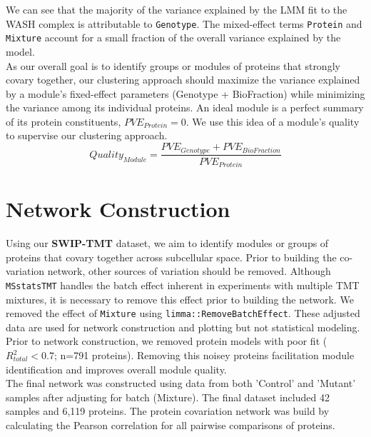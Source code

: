 \documentclass[11pt]{elife}\usepackage[]{graphicx}\usepackage[]{color}
\begin{document}
We can see that the majority of the variance explained by the LMM fit to the
WASH complex is attributable to \texttt{Genotype}. The mixed-effect terms
\texttt{Protein} and \texttt{Mixture} account for a small fraction of the 
overall variance explained by the model.\\

As our overall goal is to identify groups or modules of proteins that strongly
covary together, our clustering approach should maximize the variance explained
by a module's fixed-effect parameters (Genotype + BioFraction) while minimizing 
the variance among its individual proteins. 
An ideal module is a perfect summary of its protein constituents, 
$PVE_{Protein}=0$. We use this idea of a module's quality to supervise our 
clustering approach.\\

\begin{equation}
	Quality_{Module}=\frac{PVE_{Genotype} + PVE_{BioFraction}}{PVE_{Protein}}
\end{equation}


\section{Network Construction}

Using our \textbf{SWIP-TMT} dataset, we aim to identify modules or groups of
proteins that covary together across subcellular space. Prior to building the
co-variation network, other sources of variation should be removed. Although
\texttt{MSstatsTMT} handles the batch effect inherent in experiments with
multiple TMT mixtures, it is necessary to remove this effect prior to building
the network. We removed the effect of \texttt{Mixture} using
\texttt{limma::RemoveBatchEffect}.  These adjusted data are used for network
construction and plotting but not statistical modeling.\\

Prior to network construction, we removed protein models with poor fit 
($R^2_{total}<0.7$; n=791 proteins). Removing this noisey proteins facilitation
module identification and improves overall module quality.\\

The final network was constructed using data from both 'Control' and 'Mutant' 
samples after adjusting for batch (Mixture). The final dataset included 
42 samples and 6,119 proteins. The protein covariation network was build by
calculating the Pearson correlation for all pairwise comparisons of proteins.\\
\end{document}
